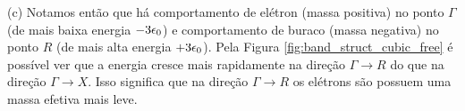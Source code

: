 \documentclass[a4paper,10pt]{article}
\begin{document}
(c) Notamos então que há comportamento de elétron (massa positiva) no ponto $\Gamma$ (de mais baixa energia $-3\epsilon_0$) e comportamento de buraco (massa negativa) no ponto $R$ (de mais alta energia $+3\epsilon_0$). Pela Figura \ref{fig:band_struct_cubic_free} é possível ver que a energia cresce mais rapidamente na direção $\Gamma \to R$ do que na direção $\Gamma \to X$. Isso significa que na direção $\Gamma \to R$ os elétrons são possuem uma massa efetiva mais leve.
\end{document}
